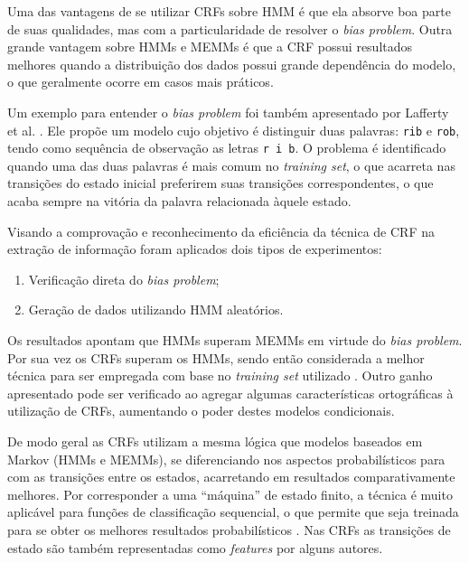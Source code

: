 Uma das vantagens de se utilizar CRFs sobre HMM é que ela absorve boa parte de suas qualidades, mas com a particularidade de resolver o \textit{bias problem}. Outra grande vantagem sobre HMMs e MEMMs é que a CRF possui resultados melhores quando a distribuição dos dados possui grande dependência do modelo, o que geralmente ocorre em casos mais práticos.

Um exemplo para entender o \textit{bias problem} foi também apresentado por Lafferty et al. \cite{Lafferty-CRF}. Ele propõe um modelo cujo objetivo é distinguir duas palavras: \texttt{rib} e \texttt{rob}, tendo como sequência de observação as letras \texttt{r i b}. O problema é identificado quando uma das duas palavras é mais comum no \textit{training set}, o que acarreta nas transições do estado inicial preferirem suas transições correspondentes, o que acaba sempre na vitória da palavra relacionada àquele estado.

Visando a comprovação e reconhecimento da eficiência da técnica de CRF na extração de informação foram aplicados dois tipos de experimentos:

\begin{enumerate}
    \item Verificação direta do \textit{bias problem};
    \item Geração de dados utilizando HMM aleatórios.
\end{enumerate}

Os resultados apontam que HMMs superam MEMMs em virtude do \textit{bias problem}. Por sua vez os CRFs superam os HMMs, sendo então considerada a melhor técnica para ser empregada com base no \textit{training set} utilizado \cite{Lafferty-CRF}. Outro ganho apresentado pode ser verificado ao agregar algumas características ortográficas à utilização de CRFs, aumentando o poder destes modelos condicionais.

De modo geral as CRFs utilizam a mesma lógica que modelos baseados em Markov (HMMs e MEMMs), se diferenciando nos aspectos probabilísticos para com as transições entre os estados, acarretando em resultados comparativamente melhores. Por corresponder a uma ``máquina'' de estado finito, a técnica é muito aplicável para funções de classificação sequencial, o que permite que seja treinada para se obter os melhores resultados probabilísticos \cite{Peng-CRF-IE}. Nas CRFs as transições de estado são também representadas como \emph{features} por alguns autores.


